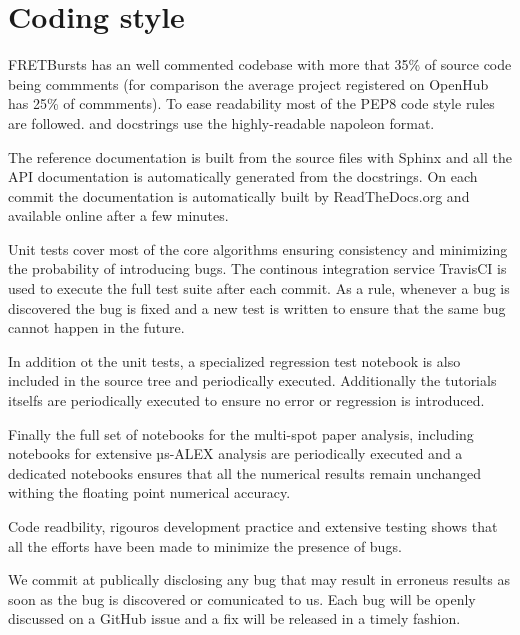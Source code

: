 \section{Coding style}

FRETBursts has an well commented codebase with more that 35\% of source code
being commments (for comparison the average project registered on OpenHub has 25\%
of commments). To ease readability most of the PEP8 code style rules are followed.
and docstrings use the highly-readable napoleon format.

The reference documentation is built from the source files with Sphinx and
all the API documentation is automatically generated from the docstrings.
On each commit the documentation is automatically built by ReadTheDocs.org
and available online after a few minutes.

Unit tests cover most of the core algorithms ensuring consistency and 
minimizing the probability of introducing bugs. The continous integration
service TravisCI is used to execute the full test suite after each commit.
As a rule, whenever a bug is discovered the bug is fixed and a new test is 
written to ensure that the same bug cannot happen in the future.

In addition ot the unit tests, a specialized regression test notebook is
also included in the source tree and periodically executed. Additionally
the tutorials itselfs are periodically executed to ensure no error or 
regression is introduced.

Finally the full set of notebooks for the multi-spot paper analysis,
including notebooks for extensive µs-ALEX analysis are periodically
executed and a dedicated notebooks ensures that all the numerical
results remain unchanged withing the floating point numerical accuracy.

Code readbility, rigouros development practice and extensive testing
shows that all the efforts have been made to minimize the presence 
of bugs.

We commit at publically disclosing any bug that may result in erroneus results 
as soon as the bug is discovered or comunicated to us.
Each bug will be openly discussed on a GitHub issue and a fix will be released 
in a timely fashion.

